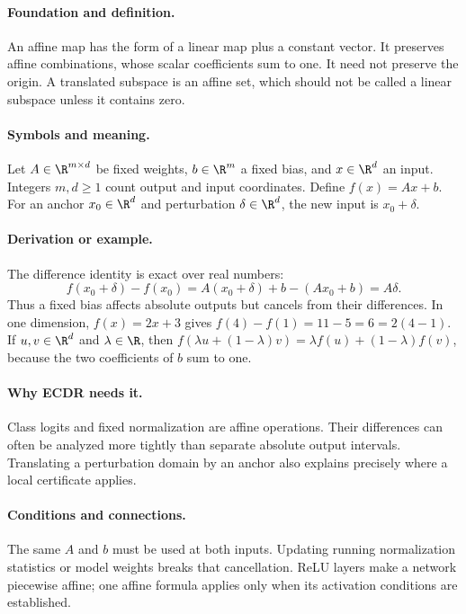 \paragraph{Foundation and definition.}
An affine map has the form of a linear map plus a constant vector.
It preserves affine combinations, whose scalar coefficients sum to one.
It need not preserve the origin. A translated subspace is an affine set,
which should not be called a linear subspace unless it contains zero.
\paragraph{Symbols and meaning.}
Let $A\in\R^{m\times d}$ be fixed weights,
$b\in\R^m$ a fixed bias, and $x\in\R^d$ an input. Integers
$m,d\ge1$ count output and input coordinates. Define
$f(x)=Ax+b$. For an anchor $x_0\in\R^d$ and perturbation
$\delta\in\R^d$, the new input is $x_0+\delta$.
\paragraph{Derivation or example.}
The difference identity is exact over real numbers:
\[
 f(x_0+\delta)-f(x_0)
 =A(x_0+\delta)+b-(Ax_0+b)=A\delta.
\]
Thus a fixed bias affects absolute outputs but cancels from their
differences. In one dimension, $f(x)=2x+3$ gives
$f(4)-f(1)=11-5=6=2(4-1)$.
If $u,v\in\R^d$ and $\lambda\in\R$, then
$f(\lambda u+(1-\lambda)v)=\lambda f(u)+(1-\lambda)f(v)$,
because the two coefficients of $b$ sum to one.
\paragraph{Why ECDR needs it.}
Class logits and fixed normalization are affine operations. Their
differences can often be analyzed more tightly than separate absolute
output intervals. Translating a perturbation domain by an anchor also
explains precisely where a local certificate applies.
\paragraph{Conditions and connections.}
The same $A$ and $b$ must be used at both inputs. Updating running
normalization statistics or model weights breaks that cancellation.
ReLU layers make a network piecewise affine; one affine formula applies
only when its activation conditions are established.

